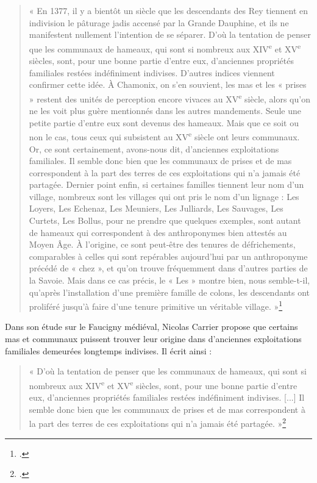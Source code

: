\documentclass[12pt,a4paper]{report}
\begin{document}
	\begin{quote}
	« En 1377, il y a bientôt un siècle que les descendants des Rey tiennent en indivision le pâturage jadis accensé par la Grande Dauphine, et ils ne manifestent nullement l’intention de se séparer. D’où la tentation de penser que les communaux de hameaux, qui sont si nombreux aux XIV\textsuperscript{e} et XV\textsuperscript{e} siècles, sont, pour une bonne partie d’entre eux, d’anciennes propriétés familiales restées indéfiniment indivises. D’autres indices viennent confirmer cette idée. À Chamonix, on s’en souvient, les mas et les « prises » restent des unités de perception encore vivaces au XV\textsuperscript{e} siècle, alors qu’on ne les voit plus guère mentionnés dans les autres mandements. Seule une petite partie d’entre eux sont devenus des hameaux. Mais que ce soit ou non le cas, tous ceux qui subsistent au XV\textsuperscript{e} siècle ont leurs communaux. Or, ce sont certainement, avons-nous dit, d’anciennes exploitations familiales. Il semble donc bien que les communaux de prises et de mas correspondent à la part des terres de ces exploitations qui n’a jamais été partagée. Dernier point enfin, si certaines familles tiennent leur nom d’un village, nombreux sont les villages qui ont pris le nom d’un lignage : Les Loyers, Les Echenaz, Les Meuniers, Les Julliards, Les Sauvages, Les Curtets, Les Bollus, pour ne prendre que quelques exemples, sont autant de hameaux qui correspondent à des anthroponymes bien attestés au Moyen Âge. À l’origine, ce sont peut-être des tenures de défrichements, comparables à celles qui sont repérables aujourd’hui par un anthroponyme précédé de « chez », et qu’on trouve fréquemment dans d’autres parties de la Savoie. Mais dans ce cas précis, le « Les » montre bien, nous semble-t-il, qu’après l’installation d’une première famille de colons, les descendants ont proliféré jusqu’à faire d’une tenure primitive un véritable village. »\footcite[247]{Carrier2001VieMontagnardeFaucigny}
\end{quote}

Dans son étude sur le Faucigny médiéval, Nicolas Carrier propose que certains mas et communaux puissent trouver leur origine dans d'anciennes exploitations familiales demeurées longtemps indivises. Il écrit ainsi :

\begin{quote}
	« D’où la tentation de penser que les communaux de hameaux, qui sont si nombreux aux XIV\textsuperscript{e} et XV\textsuperscript{e} siècles, sont, pour une bonne partie d’entre eux, d’anciennes propriétés familiales restées indéfiniment indivises. [...] Il semble donc bien que les communaux de prises et de mas correspondent à la part des terres de ces exploitations qui n’a jamais été partagée. »\footcite[247]{Carrier2001VieMontagnardeFaucigny}
\end{quote}
\end{document}
